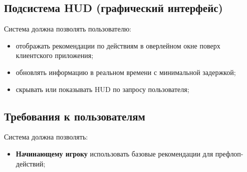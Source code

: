 \subsection{Подсистема HUD (графический интерфейс)}

Система должна позволять пользователю:

\begin{itemize}
    \item отображать рекомендации по действиям в оверлейном окне поверх клиентского приложения;
    \item обновлять информацию в реальном времени с минимальной задержкой;
    \item скрывать или показывать HUD по запросу пользователя;
\end{itemize}

\subsection{Требования к пользователям}

Система должна позволять:

\begin{itemize}
    \item \textbf{Начинающему игроку} использовать базовые рекомендации для префлоп-действий;
\end{itemize}
